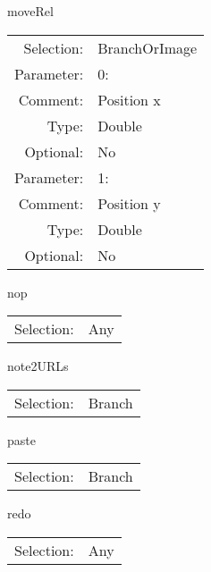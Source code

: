 \item moveRel\\
\begin{tabular}{rl}
  Selection: & BranchOrImage\\
   Parameter: &  0:\\
        Comment: & Position x\\
           Type: & Double\\
       Optional: &  No\\
   Parameter: &  1:\\
        Comment: & Position y\\
           Type: & Double\\
       Optional: &  No\\
\end{tabular}

\item nop\\
\begin{tabular}{rl}
  Selection: & Any\\
\end{tabular}

\item note2URLs\\
\begin{tabular}{rl}
  Selection: & Branch\\
\end{tabular}

\item paste\\
\begin{tabular}{rl}
  Selection: & Branch\\
\end{tabular}

\item redo\\
\begin{tabular}{rl}
  Selection: & Any\\
\end{tabular}

